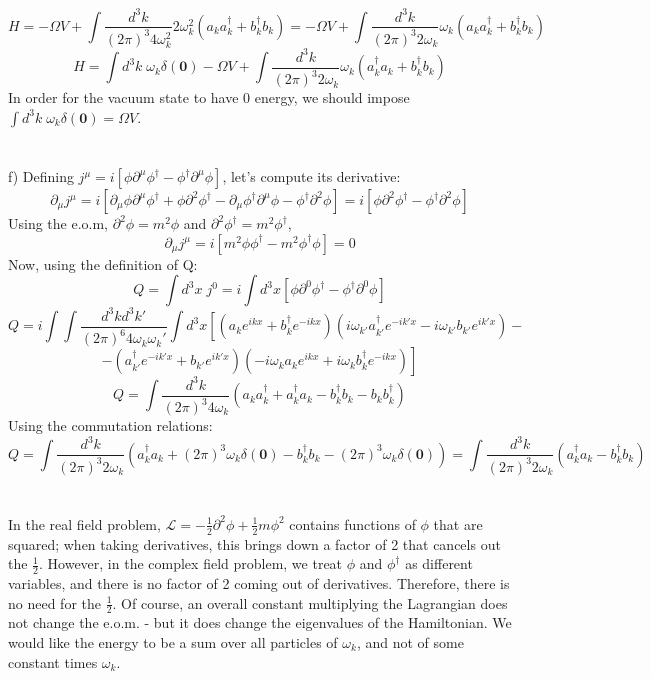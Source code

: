 \documentclass[12 pt]{article}
\begin{document}
\[   H = - \Omega V + \int \frac{d^3 k }{(2\pi)^3 4\omega_k^2}  2\omega_k^2  (a_k a_k^{\dagger} + b_k^{\dagger}b_k) =  - \Omega V + \int \frac{d^3 k }{(2\pi)^3 2\omega_k}  \omega_k  (a_k a_k^{\dagger} + b_k^{\dagger}b_k) \]
\[  H =  \int d^3 k \;\omega_k \delta(\mathbf{0}) - \Omega V + \int \frac{d^3 k }{(2\pi)^3 2\omega_k}  \omega_k  (a_k^{\dagger} a_k + b_k^{\dagger}b_k)  \]
In order for the vacuum state to have 0 energy, we should impose $ \int d^3 k \;\omega_k \delta(\mathbf{0}) = \Omega V$.
\\
\\
\\
f) Defining $j^{\mu} = i [\phi \partial^{\mu}\phi^{\dagger} - \phi^{\dagger}\partial^{\mu}\phi]$, let's compute its derivative:
\[  \partial_{\mu} j^{\mu} =   i [\partial_{\mu}\phi \partial^{\mu}\phi^{\dagger} + \phi \partial^{2}\phi^{\dagger} - \partial_{\mu}\phi^{\dagger}\partial^{\mu}\phi -  \phi^{\dagger}\partial^2\phi]  = i [\phi \partial^{2}\phi^{\dagger} -  \phi^{\dagger}\partial^2\phi] \]
Using the e.o.m, $\partial^2\phi = m^2\phi$ and $\partial^2\phi^{\dagger} = m^2\phi^{\dagger}$,
\[  \partial_{\mu} j^{\mu} =   i [ m^2 \phi \phi^{\dagger} - m^2\phi^{\dagger}\phi   ] = 0 \]
Now, using the definition of Q:
\[  Q = \int d^3 x \; j^0 = i \int d^3 x  [\phi \partial^0\phi^{\dagger} - \phi^{\dagger}\partial^0\phi]  \]
\[  Q = i \int \int \frac{d^3 k d^3 k'}{(2\pi)^6 4 \omega_k \omega_k'} \int d^3 x \left[ (a_k e^{ikx} + b_k^{\dagger} e^{-ikx} )(i\omega_{k'} a^{\dagger}_{k'} e^{-ik'x} - i\omega_{k'} b_{k'} e^{ik'x}) - \right. \]
\[ \left. - (a^{\dagger}_{k'} e^{-ik'x} + b_{k'} e^{ik'x} )(-i\omega_{k} a_{k} e^{ikx} + i\omega_{k} b_k^{\dagger} e^{-ikx})  \right]  \]
\[ Q = \int \frac{d^3 k}{(2\pi)^3 4\omega_k} (a_k a_k^{\dagger} + a_k^{\dagger} a_k - b_k^{\dagger} b_k - b_k b_k^{\dagger}) \]
Using the commutation relations:
\[ Q =  \int \frac{d^3 k}{(2\pi)^3 2\omega_k} (a_k^{\dagger} a_k + (2\pi)^3\omega_k \delta(\mathbf{0}) - b_k^{\dagger} b_k - (2\pi)^3\omega_k \delta(\mathbf{0}) )  = \int \frac{d^3 k}{(2\pi)^3 2\omega_k} (a_k^{\dagger} a_k - b_k^{\dagger} b_k ) \]
\\
\\
In the real field problem, $\mathcal{L} = -\frac{1}{2}\partial^2 \phi + \frac{1}{2} m \phi ^2$ contains functions of $\phi$ that are squared; when taking derivatives, this brings down a factor of 2 that cancels out the $\frac{1}{2}$. However, in the complex field problem, we treat $\phi$ and $\phi^{\dagger}$ as different variables, and there is no factor of 2 coming out of derivatives. Therefore, there is no need for the $\frac{1}{2}$. Of course, an overall constant multiplying the Lagrangian does not change the e.o.m. - but it does change the eigenvalues of the Hamiltonian. We would like the energy to be a sum over all particles of $\omega_k$, and not of some constant times $\omega_k$.
\end{document}
